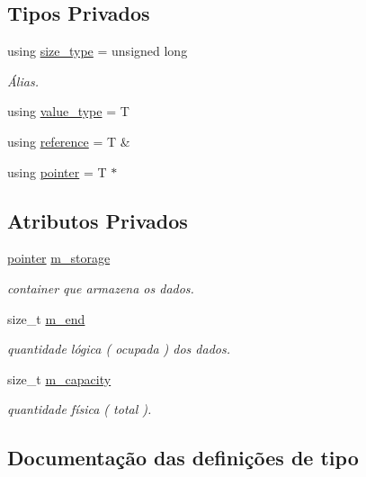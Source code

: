 \subsection*{Tipos Privados}
\begin{DoxyCompactItemize}
\item 
using \hyperlink{classst_1_1queue_adc38745992003842045bb2484ded4861}{size\+\_\+type} = unsigned long
\begin{DoxyCompactList}\small\item\em Álias. \end{DoxyCompactList}\item 
using \hyperlink{classst_1_1queue_a2a0fa1d9b72bfdad9acf67a92146b143}{value\+\_\+type} = T
\item 
using \hyperlink{classst_1_1queue_a826b47eddf0309ac74beca2f3d1e7b1c}{reference} = T \&
\item 
using \hyperlink{classst_1_1queue_ad60e399108ab295c2800f2c415c84de4}{pointer} = T $\ast$
\end{DoxyCompactItemize}
\subsection*{Atributos Privados}
\begin{DoxyCompactItemize}
\item 
\hyperlink{classst_1_1queue_ad60e399108ab295c2800f2c415c84de4}{pointer} \hyperlink{classst_1_1queue_a1e4db9739dd6b27927a710c0e52d4f10}{m\+\_\+storage}
\begin{DoxyCompactList}\small\item\em container que armazena os dados. \end{DoxyCompactList}\item 
size\+\_\+t \hyperlink{classst_1_1queue_a3ec689ca3200dccc8482fa205c5797f1}{m\+\_\+end}
\begin{DoxyCompactList}\small\item\em quantidade lógica ( ocupada ) dos dados. \end{DoxyCompactList}\item 
size\+\_\+t \hyperlink{classst_1_1queue_ad38c7e269766103855c22285ab6f72c2}{m\+\_\+capacity}
\begin{DoxyCompactList}\small\item\em quantidade física ( total ). \end{DoxyCompactList}\end{DoxyCompactItemize}


\subsection{Documentação das definições de tipo}
\mbox{\label{classst_1_1queue_ad60e399108ab295c2800f2c415c84de4}} 
